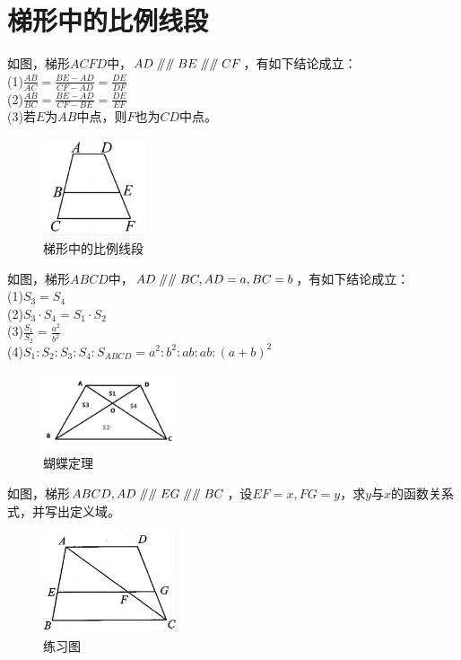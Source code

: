 \documentclass{ecnuthesis}
\newcommand\px{\mathrel{/\mkern-5mu/}}  %
\begin{document}
\section{梯形中的比例线段}
\begin{model}
    如图，梯形$ACFD$中，$AD\px \px BE\px \px CF$，有如下结论成立：\\
    (1)$\frac{AB}{AC}=\frac{BE-AD}{CF-AD}=\frac{DE}{DF}$ \\
    (2)$\frac{AB}{BC}=\frac{BE-AD}{CF-BE}=\frac{DE}{EF}$ \\
    (3)若$E$为$AB$中点，则$F$也为$CD$中点。
\end{model}
\begin{figure}[H]
\centering
\includegraphics[width=3cm]{picture/808.png}
\caption{梯形中的比例线段}
\end{figure}
\begin{model}
    如图，梯形$ABCD$中，$AD\px\px BC,AD=a,BC=b$，有如下结论成立：\\
    (1)$S_3=S_4$ \\
    (2)$S_3·S_4=S_1·S_2$ \\
    (3)$\frac{S_1}{S_2}=\frac{a^2}{b^2}$ \\
    (4)$S_1:S_2:S_3:S_4:S_{ABCD}=a^2:b^2:ab:ab:(a+b)^2$
\end{model}
\begin{figure}[H]
\centering
\includegraphics[width=4cm]{picture/690.png}
\caption{蝴蝶定理}
\end{figure}
\begin{problem}
    如图，梯形$ABCD,AD\px \px EG \px \px BC$，设$EF=x,FG=y$，求$y$与$x$的函数关系式，并写出定义域。\\
\end{problem}
\begin{figure}[H]
\centering
\includegraphics[width=4cm]{picture/851.png}
\caption{练习图}
\end{figure}
\clearpage
\end{document}
